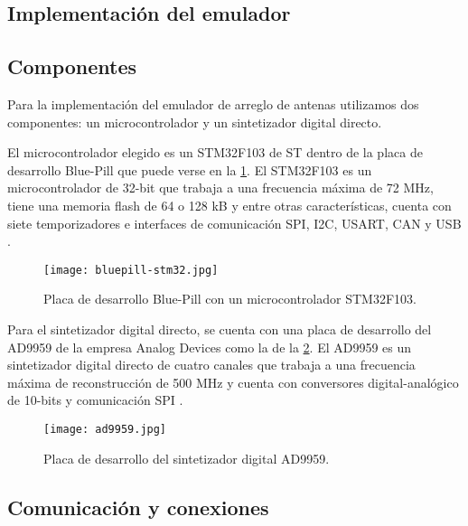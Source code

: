 \documentclass{article}
\newenvironment{standalone}{\begin{preview}}{\end{preview}}
\begin{document}
\begin{standalone}
  \section{Implementación del emulador}

  \subsection{Componentes}

  Para la implementación del emulador de arreglo de antenas utilizamos dos componentes: un microcontrolador y un sintetizador digital directo.

  El microcontrolador elegido es un STM32F103 de ST dentro de la placa de desarrollo Blue-Pill que puede verse en la \cref{fig:blue-pill}.
  El STM32F103 es un microcontrolador de 32-bit que trabaja a una frecuencia máxima de 72 MHz, tiene una memoria flash de 64 o 128 kB y entre otras características, cuenta con siete temporizadores e interfaces de comunicación SPI, I2C, USART, CAN y USB \cite{STM32F103_datasheet}.

  \begin{figure}[!htbp]
    \centering
    \texttt{[image: bluepill-stm32.jpg]}
    \caption{Placa de desarrollo Blue-Pill con un microcontrolador STM32F103.}
    \label{fig:blue-pill}
  \end{figure}

  Para el sintetizador digital directo, se cuenta con una placa de desarrollo del AD9959 de la empresa Analog Devices como la de la \cref{fig:ad9959}.
  El AD9959 es un sintetizador digital directo de cuatro canales que trabaja a una frecuencia máxima de reconstrucción de 500 MHz y cuenta con conversores digital-analógico de 10-bits y comunicación SPI \cite{ad9959_datasheet}.

  \begin{figure}[!htbp]
    \centering
    \texttt{[image: ad9959.jpg]}
    \caption{Placa de desarrollo del sintetizador digital AD9959.}
    \label{fig:ad9959}
  \end{figure}

  \subsection{Comunicación y conexiones}


\end{standalone}
\end{document}
